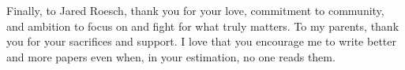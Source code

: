 Finally, to Jared Roesch, thank you for your love, commitment to community,
and ambition to focus on and fight for what truly matters. To my parents,
thank you for your sacrifices and support. I love that you
encourage me to write better and more papers even when, in your estimation,
no one reads them.

















